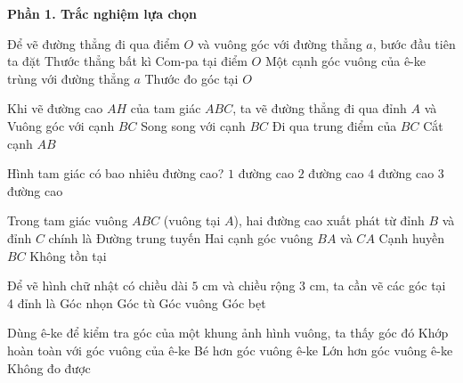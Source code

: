 \textbf{Phần 1. Trắc nghiệm lựa chọn}

\begin{ex} %
Để vẽ đường thẳng đi qua điểm $O$ và vuông góc với đường thẳng $a$, bước đầu tiên ta đặt
\choice
{Thước thẳng bất kì}
{Com-pa tại điểm $O$}
{\True Một cạnh góc vuông của ê-ke trùng với đường thẳng $a$}
{Thước đo góc tại $O$}
\end{ex}

\begin{ex} %
Khi vẽ đường cao $AH$ của tam giác $ABC$, ta vẽ đường thẳng đi qua đỉnh $A$ và
\choice
{\True Vuông góc với cạnh $BC$}
{Song song với cạnh $BC$}
{Đi qua trung điểm của $BC$}
{Cắt cạnh $AB$}
\end{ex}

\begin{ex} %
Hình tam giác có bao nhiêu đường cao?
\choice
{$1$ đường cao}
{$2$ đường cao}
{$4$ đường cao}
{\True $3$ đường cao}
\end{ex}

\begin{ex} %
Trong tam giác vuông $ABC$ (vuông tại $A$), hai đường cao xuất phát từ đỉnh $B$ và đỉnh $C$ chính là
\choice
{Đường trung tuyến}
{\True Hai cạnh góc vuông $BA$ và $CA$}
{Cạnh huyền $BC$}
{Không tồn tại}
\end{ex}

\begin{ex} %
Để vẽ hình chữ nhật có chiều dài $5\text{ cm}$ và chiều rộng $3\text{ cm}$, ta cần vẽ các góc tại 4 đỉnh là
\choice
{Góc nhọn}
{Góc tù}
{\True Góc vuông}
{Góc bẹt}
\end{ex}

\begin{ex} %
Dùng ê-ke để kiểm tra góc của một khung ảnh hình vuông, ta thấy góc đó
\choice
{\True Khớp hoàn toàn với góc vuông của ê-ke}
{Bé hơn góc vuông ê-ke}
{Lớn hơn góc vuông ê-ke}
{Không đo được}
\end{ex}

